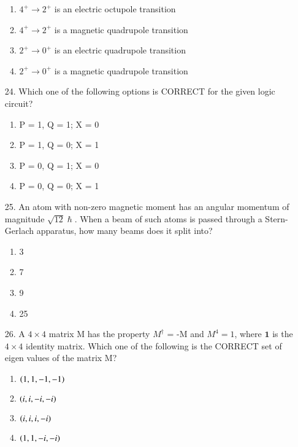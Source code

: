 \documentclass[journal]{IEEEtran}
\begin{document}
\begin{enumerate}
\begin{figure}[!ht]
        \centering
        \caption{}
    \end{figure}
    \begin{enumerate}[label = (\Alph*)]
        \item $4^+\to 2^+$  is an electric octupole transition
        \item $4^+\to 2^+$  is a magnetic quadrupole transition
        \item $2^+\to 0^+$  is an electric quadrupole transition
        \item $2^+\to 0^+$  is a magnetic quadrupole transition
    \end{enumerate}
    \item[24.] Which one of the following options is CORRECT for the given logic circuit?
    \begin{figure}[!ht]
        \centering
        \caption{}
    \end{figure}
    \begin{enumerate}[label = (\Alph*)]
        \item P = 1, Q = 1; X = 0
        \item P = 1, Q = 0; X = 1
        \item P = 0, Q = 1; X = 0
        \item P = 0, Q = 0; X = 1
    \end{enumerate}
    \item[25.] An atom with non-zero magnetic moment has an angular momentum of magnitude $\sqrt{12}\hslash$. When a beam of such atoms is passed through a Stern-Gerlach apparatus, how many beams does it split into?
    \begin{enumerate}[label = (\Alph*)]
        \item 3
        \item 7
        \item 9
        \item 25
    \end{enumerate}
    \item[26.] A $4\times4$ matrix M has the property $M^\dagger$ = -M and $M^4=1$,  where $\mathbf{1}$ is the $4\times4$ identity matrix. Which one of the following is the CORRECT set of eigen values of the matrix M?
    \begin{enumerate}[label=(\Alph*)]
        \item $\left(1,1,-1,-1\right)$
        \item $\left(i,i,-i,-i\right)$
        \item $\left(i,i,i,-i\right)$
        \item $\left(1,1,-i,-i\right)$
    \end{enumerate}
\end{enumerate}
\end{document}
